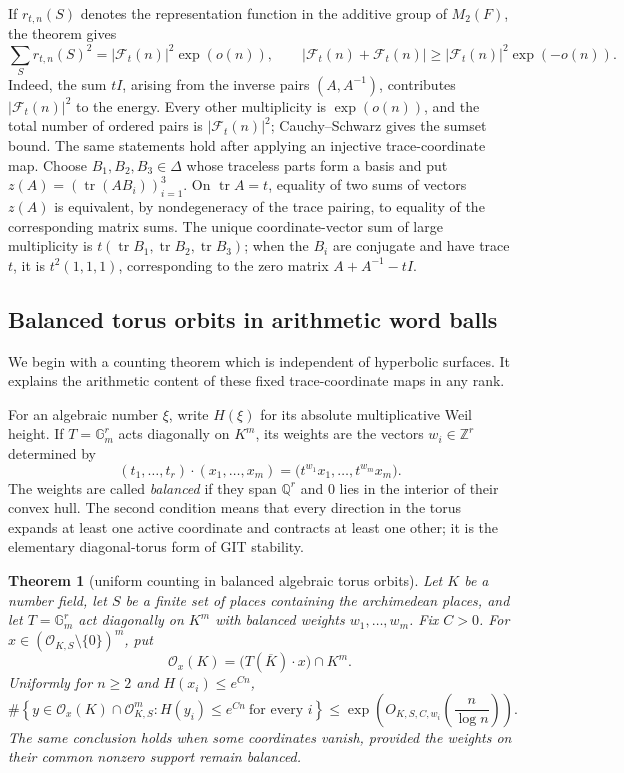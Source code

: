\documentclass[11pt,reqno]{amsart}
\newtheorem{theorem}{Theorem}[section]
\theoremstyle{definition}
\theoremstyle{remark}
\newcommand{\Q}{\mathbb Q}
\newcommand{\Z}{\mathbb Z}
\newcommand{\Gm}{\mathbb G_m}
\newcommand{\cO}{\mathcal O}
\newcommand{\Tr}{\operatorname{tr}}
\begin{document}
If \(r_{t,n}(S)\) denotes the representation function in the additive group
of \(M_2(F)\), the theorem gives
\[
 \sum_S r_{t,n}(S)^2
   =|\mathcal F_t(n)|^2\exp(o(n)),
 \qquad
 |\mathcal F_t(n)+\mathcal F_t(n)|
   \ge |\mathcal F_t(n)|^2\exp(-o(n)).
\]
Indeed, the sum \(tI\), arising from the inverse pairs
\((A,A^{-1})\), contributes \(|\mathcal F_t(n)|^2\) to the energy.  Every
other multiplicity is \(\exp(o(n))\), and the total number of
ordered pairs is \(|\mathcal F_t(n)|^2\); Cauchy--Schwarz gives the sumset
bound.  The same statements hold after applying an injective
trace-coordinate map.  Choose
\(B_1,B_2,B_3\in\Delta\) whose traceless parts form a basis and put
\(z(A)=(\Tr(AB_i))_{i=1}^3\).  On \(\Tr A=t\), equality of two sums of
vectors \(z(A)\) is equivalent, by nondegeneracy of the trace pairing, to
equality of the corresponding matrix sums.  The unique coordinate-vector
sum of large
multiplicity is
\(t(\Tr B_1,\Tr B_2,\Tr B_3)\); when the \(B_i\) are conjugate and have
trace \(t\), it is
\(t^2(1,1,1)\), corresponding to the zero matrix
\(A+A^{-1}-tI\).

\subsection{Balanced torus orbits in arithmetic word balls}

We begin with a counting theorem which is independent of hyperbolic surfaces.
It explains the arithmetic content of these fixed trace-coordinate maps in
any rank.

For an algebraic number \(\xi\), write \(H(\xi)\) for its absolute
multiplicative Weil height.  If
\(T=\Gm^r\) acts diagonally on \(K^m\), its weights are the vectors
\(w_i\in\Z^r\) determined by
\[
 (t_1,\ldots,t_r)\cdot(x_1,\ldots,x_m)
 =\bigl(t^{w_1}x_1,\ldots,t^{w_m}x_m\bigr).
\]
The weights are called \emph{balanced} if they span \(\Q^r\) and \(0\) lies
in the interior of their convex hull.  The second condition means that every
direction in the torus expands at least one active coordinate and contracts
at least one other; it is the elementary diagonal-torus form of GIT
stability.

\begin{theorem}[uniform counting in balanced algebraic torus orbits]
\label{thm:balanced-torus}
Let \(K\) be a number field, let \(S\) be a finite set of places containing
the archimedean places, and let \(T=\Gm^r\) act diagonally on \(K^m\) with
balanced weights \(w_1,\ldots,w_m\).  Fix \(C>0\).  For
\(x\in(\cO_{K,S}\setminus\{0\})^m\), put
\[
 \mathcal O_x(K)=\bigl(T(\overline K)\cdot x\bigr)\cap K^m.
\]
Uniformly for \(n\ge2\) and \(H(x_i)\le e^{Cn}\),
\[
 \#\left\{y\in\mathcal O_x(K)\cap\cO_{K,S}^m:
       H(y_i)\le e^{Cn}\ \text{for every }i\right\}
 \le
 \exp\!\left(O_{K,S,C,w_i}\!\left(\frac n{\log n}\right)\right).
\tag{12.8}
\]
The same conclusion holds when some coordinates vanish, provided the weights
on their common nonzero support remain balanced.
\end{theorem}
\end{document}
